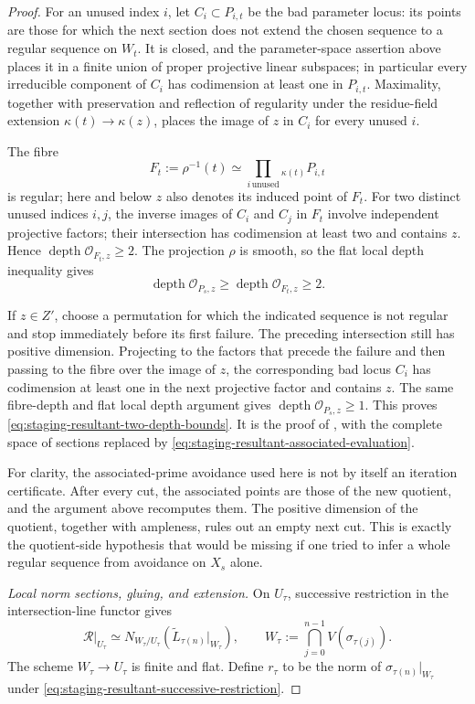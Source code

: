 \begin{proof}
For an unused index \(i\), let \(C_i\subset P_{i,t}\) be the bad parameter
locus: its points are those for which the next section does not extend the
chosen sequence to a regular sequence on \(W_t\).  It is closed, and the
parameter-space assertion above places it in a finite union of proper
projective linear subspaces; in particular every irreducible component of
\(C_i\) has codimension at least one in \(P_{i,t}\).  Maximality, together
with preservation and reflection of regularity under the residue-field extension
\(\kappa(t)\to\kappa(z)\), places the image of \(z\) in \(C_i\) for every
unused \(i\).

The fibre
\[
 F_t:=\rho^{-1}(t)
 \simeq\prod_{i\,\mathrm{unused}}{}_{\kappa(t)}P_{i,t}
\]
is regular; here and below \(z\) also denotes its induced point of \(F_t\).
For two distinct unused indices \(i,j\), the inverse images of
\(C_i\) and \(C_j\) in \(F_t\) involve independent projective factors;
their intersection has codimension at least two and contains \(z\).  Hence
\(\operatorname{depth}\mathcal O_{F_t,z}\geq2\).  The projection \(\rho\)
is smooth, so the flat local depth inequality gives
\[
 \operatorname{depth}\mathcal O_{P_s,z}
 \geq \operatorname{depth}\mathcal O_{F_t,z}
 \geq2.
\]

If \(z\in Z'\), choose a permutation for which the indicated sequence is
not regular and stop immediately before its first failure.  The preceding
intersection still has positive dimension.  Projecting to the factors that
precede the failure and then passing to the fibre over the image of \(z\),
the corresponding bad locus \(C_i\) has codimension at least one in the
next projective factor and contains \(z\).  The same fibre-depth and flat
local depth argument gives
\(\operatorname{depth}\mathcal O_{P_s,z}\geq1\).  This proves
\eqref{eq:staging-resultant-two-depth-bounds}.  It is the proof of
\cite[Lemma~6.3.2]{Ducrot05Cube}, with the complete space of sections
replaced by \eqref{eq:staging-resultant-associated-evaluation}.

For clarity, the associated-prime avoidance used here is not by itself an
iteration certificate.  After every cut, the associated points are those
of the new quotient, and the argument above recomputes them.  The positive
dimension of the quotient, together with ampleness, rules out an empty
next cut.  This is exactly the quotient-side hypothesis that would be
missing if one tried to infer a whole regular sequence from avoidance on
\(X_s\) alone.

\medskip
\noindent\emph{Local norm sections, gluing, and extension.}
On \(U_\tau\), successive restriction in the intersection-line functor
gives
\begin{equation}\label{eq:staging-resultant-successive-restriction}
 \mathscr R|_{U_\tau}
 \simeq
 N_{W_\tau/U_\tau}
 \left(\widetilde L_{\tau(n)}|_{W_\tau}\right),
 \qquad
 W_\tau:=
 \bigcap_{j=0}^{n-1}V(\sigma_{\tau(j)}).
\end{equation}
The scheme \(W_\tau\to U_\tau\) is finite and flat.  Define \(r_\tau\) to
be the norm of \(\sigma_{\tau(n)}|_{W_\tau}\) under
\eqref{eq:staging-resultant-successive-restriction}.


\end{proof}
